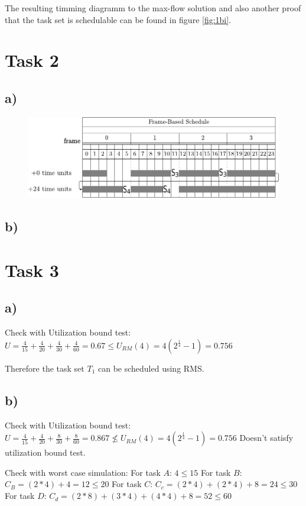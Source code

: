 \documentclass[10pt,a4paper]{article}
\begin{document}
The resulting timming diagramm to the max-flow solution and also another proof that the task set is schedulable can be found in figure \ref{fig:1bi}.

\section*{Task 2}
\subsection*{a)}

\begin{figure}[h]
\includegraphics[width=\linewidth]{2a.pdf}
\label{fig:2a}
\end{figure}
\subsection*{b)}

\section*{Task 3}
\subsection*{a)}
Check with Utilization bound test:
\newline
$U = \frac{4}{15} + \frac{4}{20} + \frac{4}{30} + \frac{4}{60} = 0.67 \leq U_{RM}(4) = 4(2^{\frac{1}{4}} - 1) = 0.756$

Therefore the task set $T_1$ can be scheduled using RMS.

\subsection*{b)}
Check with Utilization bound test:
\newline
$U = \frac{4}{15} + \frac{4}{20} + \frac{8}{30} + \frac{8}{60} = 0.867 \nleq U_{RM}(4) = 4(2^{\frac{1}{4}} - 1) = 0.756$
Doesn't satisfy  utilization bound test.

Check with worst case simulation:
\newline
For task $A$: $4 \leq 15$
\newline
For task $B$: $C_B = (2 * 4) + 4 = 12 \leq 20$
\newline
For task $C$: $C_c = (2 * 4) + (2 * 4) + 8 = 24 \leq 30$
\newline
For task $D$: $C_d = (2 * 8) + (3 * 4) + (4 * 4) + 8 = 52 \leq 60$
\end{document}
